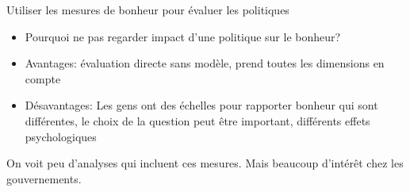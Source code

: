 \documentclass[handout]{beamer}
\begin{document}
\begin{frame}{Utiliser les mesures de bonheur pour évaluer les politiques}

\begin{itemize}
\item Pourquoi ne pas regarder impact d'une politique sur le bonheur?
\item Avantages: évaluation directe sans modèle, prend toutes les dimensions en compte
\item Désavantages: Les gens ont des échelles pour rapporter bonheur qui sont différentes, le choix de la question peut être important, différents effets psychologiques
\end{itemize}

On voit peu d'analyses qui incluent ces mesures. Mais beaucoup d'intérêt chez les gouvernements. 
\end{frame}
\end{document}

